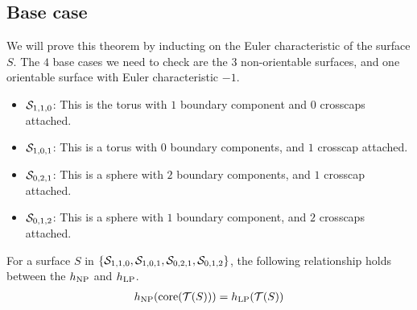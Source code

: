 \documentclass[12pt, reqno]{amsart}
\begin{document}
\subsection{Base case}
\label{sec:base-case}

We will prove this theorem by inducting on the Euler characteristic of the surface $S$.
The $4$ base cases we need to check are the $3$ non-orientable surfaces, and one orientable surface with Euler characteristic $-1$.
\begin{itemize}
\item $\mathcal{S}_{1,1,0}$: This is the torus with $1$ boundary component and $0$ crosscaps attached.
\item $\mathcal{S}_{1,0,1}$: This is a torus with $0$ boundary components, and $1$ crosscap attached.
\item $\mathcal{S}_{0,2,1}$: This is a sphere with $2$ boundary components, and $1$ crosscap attached.
\item $\mathcal{S}_{0,1,2}$: This is a sphere with $1$ boundary component, and $2$ crosscaps attached.
\end{itemize}


\begin{lemma}
  \label{lem:entropy-equality-base-case}
  For a surface $S$ in $\left\{ \mathcal{S}_{1,1,0}, \mathcal{S}_{1,0,1}, \mathcal{S}_{0,2,1}, \mathcal{S}_{0,1,2} \right\}$, the following relationship holds between the $h_{\mathrm{NP}}$ and $h_{\mathrm{LP}}$.
  \begin{align*}
    h_{\mathrm{NP}}(\mathrm{core}(\mathcal{T}(S))) = h_{\mathrm{LP}}(\mathcal{T}(S))
  \end{align*}
\end{lemma}
\end{document}
